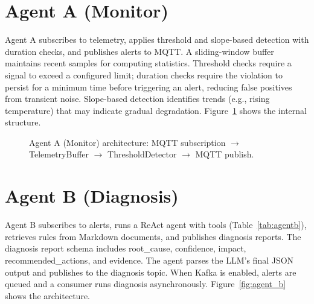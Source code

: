 \documentclass[12pt,letterpaper]{report}
\begin{document}
\section{Agent A (Monitor)}

Agent A subscribes to telemetry, applies threshold and slope-based detection with duration checks, and publishes alerts to MQTT. A sliding-window buffer maintains recent samples for computing statistics. Threshold checks require a signal to exceed a configured limit; duration checks require the violation to persist for a minimum time before triggering an alert, reducing false positives from transient noise. Slope-based detection identifies trends (e.g., rising temperature) that may indicate gradual degradation. Figure~\ref{fig:agent_a} shows the internal structure.

\begin{figure}[htbp]
\centering
{}
\caption{Agent A (Monitor) architecture: MQTT subscription $\rightarrow$ TelemetryBuffer $\rightarrow$ ThresholdDetector $\rightarrow$ MQTT publish.}
\label{fig:agent_a}
\end{figure}

\section{Agent B (Diagnosis)}

Agent B subscribes to alerts, runs a ReAct agent with tools (Table~\ref{tab:agentb}), retrieves rules from Markdown documents, and publishes diagnosis reports. The diagnosis report schema includes root\_cause, confidence, impact, recommended\_actions, and evidence. The agent parses the LLM's final JSON output and publishes to the diagnosis topic. When Kafka is enabled, alerts are queued and a consumer runs diagnosis asynchronously. Figure~\ref{fig:agent_b} shows the architecture.
\end{document}
